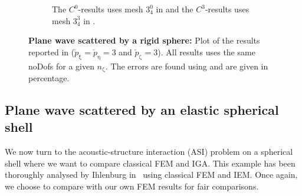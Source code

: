 \begin{figure}
\begin{subfigure}{\textwidth}
	\caption{The $C^0$-results uses mesh $3_4^0$ in  and the $C^3$-results uses mesh $3_4^3$ in .}
	\label{Fig2:plot_p4q3mesh3}
	\end{subfigure}
	\caption{\textbf{Plane wave scattered by a rigid sphere:} Plot of the results reported in  ($\check{p}_\upxi=\check{p}_\upeta=3$ and $\check{p}_\upzeta=3$). All results uses the same noDofs for a given $n_\upzeta$. The errors are found using  and are given in percentage.}
	\label{Fig2:plot_p4q3}
\end{figure}

\clearpage
\subsection{Plane wave scattered by an elastic spherical shell}
We now turn to the acoustic-structure interaction (ASI) problem on a spherical shell where we want to compare classical FEM and IGA. This example has been thoroughly analysed by Ihlenburg in~\cite{Ihlenburg1998fea} using classical FEM and IEM. Once again, we choose to compare with our own FEM results for fair comparisons.

